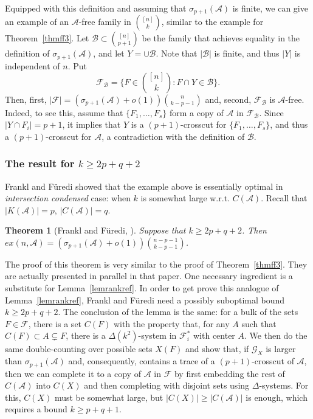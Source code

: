 \documentclass[graybox]{svmult}
\renewcommand{\ge}{\geqslant}
\newcommand{\ff}{\mathcal{F}}
\newcommand{\m}{\mathcal}
\newtheorem{thm}{Theorem}
\begin{document}
Equipped with this definition and assuming that $\sigma_{p+1}(\m A)$ is finite, we can give an example of an $\m A$-free family in ${[n]\choose k}$, similar to the example for Theorem~\ref{thmff3}. Let $\m B\subset {[n]\choose p+1}$ be the family that achieves equality in the definition of $\sigma_{p+1}(\m A)$, and let $Y = \cup \m B$. Note that $|\m B|$ is finite, and thus $|Y|$ is independent of $n$.  Put
$$\ff_{\m B}= \Big\{F\in {[n]\choose k}: F\cap Y\in \m B\Big\}.$$
Then, first, $|\ff| = (\sigma_{p+1}(\m A)+o(1)){n\choose k-p-1}$ and, second, $\ff_{\m B}$ is $\m A$-free. Indeed, to see this, assume that $\{F_1,\ldots, F_s\}$ form a copy of $\m A$ in $\ff_{\m B}$. Since $|Y\cap F_i|=p+1$, it implies that $Y$ is a $(p+1)$-crosscut for $\{F_1,\ldots, F_s\}$, and thus a $(p+1)$-crosscut for $\m A$, a contradiction with the definition of $\m B$.

\subsubsection{The result for $k\ge 2p+q+2$} Frankl and F\"uredi showed that the example above is essentially optimal in {\it intersection condensed} case: when $k$ is somewhat large w.r.t. $C(\m A)$. Recall that $|K(\m A)| = p$, $|C(\m A)|=q$.



\begin{thm}[Frankl and F\"uredi, \cite{FF2}]\label{thmff4} Suppose that $k\ge 2p+q+2$. Then $ex(n,\m A) = (\sigma_{p+1}(\m A)+o(1)){n-p-1\choose k-p-1}$.
\end{thm}


The proof of this theorem is very similar to the proof of Theorem~\ref{thmff3}. They are actually presented in parallel in that paper. One necessary ingredient is a substitute for Lemma~\ref{lemrankref}. In order to get prove this analogue of Lemma~\ref{lemrankref}, Frankl and F\"uredi need a possibly suboptimal bound $k\ge 2p+q+2$. The conclusion of the lemma is the same: for a bulk of the sets $F\in \ff$, there is a set $C(F)$ with the property that, for any $A$ such that $C(F)\subset A\subsetneq F$, there is a $\Delta(k^2)$-system in $\ff_i^*$ with center $A$. We then do the same double-counting over possible sets $X(F)$ and show that, if $\m G_X$ is larger than $\sigma_{p+1}(\m A)$ and, consequently, contains a trace of a $(p+1)$-crosscut of $\m A$, then we can complete it to a copy of $\m A$ in $\ff$ by first embedding the rest of $C(\m A)$ into  $C(X)$ and then completing with disjoint sets using $\Delta$-systems. For this, $C(X)$ must be somewhat large, but $|C(X)|\ge |C(\m A)|$ is enough, which requires a bound $k\ge p+q+1$.
\end{document}
